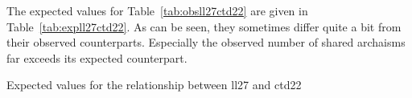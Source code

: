 


The expected values for Table~\ref{tab:obsll27ctd22} are given in Table~\ref{tab:expll27ctd22}. As can be seen, they sometimes differ quite a bit from their observed counterparts. Especially the observed number of shared archaisms far exceeds its expected counterpart. 

\begin{table}[h]
  \centering
  
  \caption{Expected values for the relationship between \gls{ll27} and \gls{ctd22}}
  \label{tab:expll27ctd22}
\end{table}



